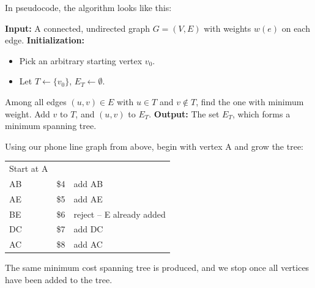 In pseudocode, the algorithm looks like this:

\begin{algorithm}[H]
\caption{Prim's Algorithm}
\begin{algorithmic}[1]
\State \textbf{Input:} A connected, undirected graph \( G = (V, E) \) with weights \( w(e) \) on each edge.
\State \textbf{Initialization:}
  \begin{itemize}
    \item Pick an arbitrary starting vertex \( v_0 \).
    \item Let \( T \gets \{v_0\} \), \( E_T \gets \emptyset \).
  \end{itemize}
  \State Among all edges \( (u, v) \in E \) with \( u \in T \) and \( v \notin T \), find the one with minimum weight.
  \State Add \( v \) to \( T \), and \( (u,v) \) to \( E_T \).
\EndWhile
\State \textbf{Output:} The set \( E_T \), which forms a minimum spanning tree.
\end{algorithmic}
\end{algorithm}

\begin{example}{}{} %
Using our phone line graph from above, begin with vertex A and grow the tree:\\
\begin{minipage}{.5\textwidth}
\begin{tabular}{lll}
Start at A&&\\
AB&	\$4&	add AB\\
AE	&\$5	&add AE\\
BE	&\$6&	reject -- E already added\\
DC	&\$7&	add DC\\
AC&\$8&	add AC\\
\end{tabular}
\end{minipage}
%
\begin{minipage}{.5\textwidth}
\end{minipage}

The same minimum cost spanning tree is produced, and we stop once all vertices have been added to the tree.
\end{example}

